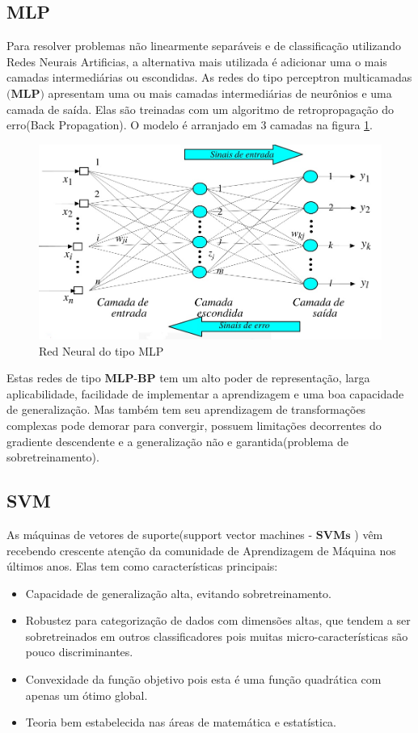 \documentclass[12pt]{article}
\begin{document}
\subsection{MLP}
Para resolver problemas não linearmente separáveis e de classificação utilizando Redes Neurais Artificias, a alternativa mais utilizada é adicionar uma o mais camadas intermediárias ou escondidas. As redes do tipo perceptron multicamadas $\textbf{(MLP)}$ apresentam uma ou mais camadas intermediárias de neurônios e uma camada de saída. Elas são treinadas com um algoritmo de retropropagação do erro(Back Propagation).
O modelo é arranjado em 3 camadas na figura \ref{fig:mlp}.
\begin{figure}[h]
\centering
\includegraphics[width=4.5in]{../out/mlp.jpg}
\caption{Red Neural do tipo MLP}
\label{fig:mlp}
\end{figure} 

Estas redes de tipo $\textbf{MLP-BP}$ tem um alto poder de representação, larga aplicabilidade, facilidade de implementar a aprendizagem e uma boa capacidade de generalização. Mas também tem seu aprendizagem de transformações complexas pode demorar para convergir, possuem limitações decorrentes do gradiente descendente e a generalização não e garantida(problema de sobretreinamento).
\subsection{SVM}
As máquinas de vetores de suporte(support vector machines - $\textbf{SVMs}$ ) vêm recebendo crescente atenção da comunidade de Aprendizagem de Máquina nos últimos anos. Elas tem como características principais:
\begin{itemize}
    \item Capacidade de generalização alta, evitando sobretreinamento.
    \item Robustez para categorização de dados com dimensões altas, que tendem a ser sobretreinados em outros classificadores pois muitas micro-características são pouco discriminantes.
    \item Convexidade da função objetivo pois esta é uma função quadrática com apenas um ótimo global. 
    \item Teoria bem estabelecida nas áreas de matemática e estatística.
\end{itemize}
\end{document}
